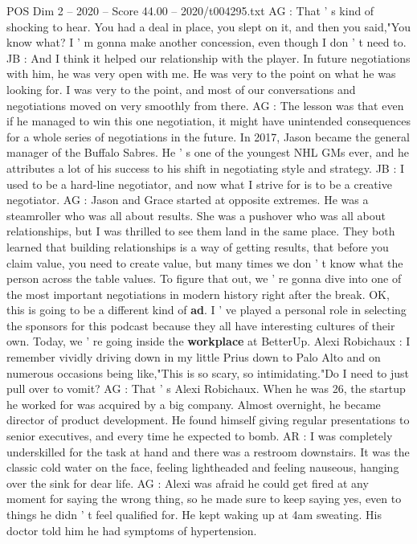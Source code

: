\begin{textsample}{POS Dim 2 – 2020 – Score 44.00 – 2020/t004295.txt}
AG : That ' s kind of shocking to hear.
You had a deal in place, you slept on it, and then you said,"You know what?
I ' m gonna make another concession, even though I don ' t need to.
JB : And I think it helped our relationship with the player.
In future negotiations with him, he was very open with me.
He was very to the point on what he was looking for.
I was very to the point, and most of our conversations and negotiations moved on very smoothly from there.
AG : The lesson was that even if he managed to win this one negotiation, it might have unintended consequences for a whole series of negotiations in the future.
In 2017, Jason became the general manager of the Buffalo Sabres.
He ' s one of the youngest NHL GMs ever, and he attributes a lot of his success to his shift in negotiating style and strategy.
JB : I used to be a hard-line negotiator, and now what I strive for is to be a creative negotiator.
AG : Jason and Grace started at opposite extremes.
He was a steamroller who was all about results.
She was a pushover who was all about relationships, but I was thrilled to see them land in the same place.
They both learned that building relationships is a way of getting results, that before you claim value, you need to create value, but many times we don ' t know what the person across the table values.
To figure that out, we ' re gonna dive into one of the most important negotiations in modern history right after the break.
OK, this is going to be a different kind of \textbf{ad}.
I ' ve played a personal role in selecting the sponsors for this podcast because they all have interesting cultures of their own.
Today, we ' re going inside the \textbf{workplace} at BetterUp.
Alexi Robichaux : I remember vividly driving down in my little Prius down to Palo Alto and on numerous occasions being like,"This is so scary, so intimidating."Do I need to just pull over to vomit?
AG : That ' s Alexi Robichaux.
When he was 26, the startup he worked for was acquired by a big company.
Almost overnight, he became director of product development.
He found himself giving regular presentations to senior executives, and every time he expected to bomb.
AR : I was completely underskilled for the task at hand and there was a restroom downstairs.
It was the classic cold water on the face, feeling lightheaded and feeling nauseous, hanging over the sink for dear life.
AG : Alexi was afraid he could get fired at any moment for saying the wrong thing, so he made sure to keep saying yes, even to things he didn ' t feel qualified for.
He kept waking up at 4am sweating.
His doctor told him he had symptoms of hypertension.

\end{textsample}
